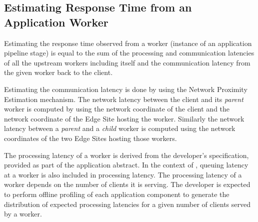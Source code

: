 \subsection{Estimating Response Time from an Application Worker}
\par Estimating the response time observed from a worker (instance of an application pipeline stage) is equal to the sum of the processing and communication latencies of all the upstream workers including itself and the communication latency from the given worker back to the client. 
\par Estimating the communication latency is done by using the Network Proximity Estimation mechanism. The network latency between the client and its \textit{parent} worker is computed by using the network coordinate of the client and the network coordinate of the Edge Site hosting the worker. Similarly the network latency between a \textit{parent} and a \textit{child} worker is computed using the network coordinates of the two Edge Sites hosting those workers.
\par The processing latency of a worker is derived from the developer's specification, provided as part of the application abstract. In the context of \oneedge{}, queuing latency at a worker is also included in processing latency. The processing latency of a worker depends on the number of clients it is serving. The developer is expected to perform offline profiling of each application component to generate the distribution of expected processing latencies for a given number of clients served by a worker.


